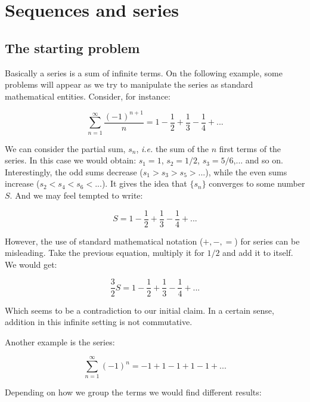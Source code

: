 \chapter{Sequences and series}

\section{The starting problem}

Basically a series is a sum of infinite terms. On the following example, some problems will appear as we try to manipulate the series as standard mathematical entities. Consider, for instance:

\begin{equation}
    \sum \limits_{n=1}^\infty \frac{(-1)^{n+1}}{n} = 1 - \frac{1}{2} + \frac{1}{3} - \frac{1}{4} + ...
\end{equation}

We can consider the partial sum, $s_n$, \emph{i.e.} the sum of the $n$ first terms of the series. In this case we would obtain: $s_1 = 1$, $s_2 = 1/2$, $s_3 = 5/6$,... and so on. Interestingly, the odd sums decrease ($s_1 > s_3 > s_5 > ...$), while the even sums increase ($s_2 < s_4 < s_6 < ...$). It gives the idea that $\{s_n\}$ converges to some number $S$. And we may feel tempted to write:

\begin{equation*}
    S = 1 - \frac{1}{2} + \frac{1}{3} - \frac{1}{4} + ...
\end{equation*}

However, the use of standard mathematical notation ($+, -, =$) for series can be misleading. Take the previous equation, multiply it for $1/2$ and add it to itself. We would get:

\begin{equation*}
    \frac{3}{2}S = 1 - \frac{1}{2} + \frac{1}{3} - \frac{1}{4} + ...
\end{equation*}

Which seems to be a contradiction to our initial claim. In a certain sense, addition in this infinite setting is not commutative.

Another example is the series:

\begin{equation}
    \sum \limits_{n=1}^\infty (-1)^n = -1 + 1 - 1 + 1 - 1 + ...
\end{equation}

Depending on how we group the terms we would find different results:

